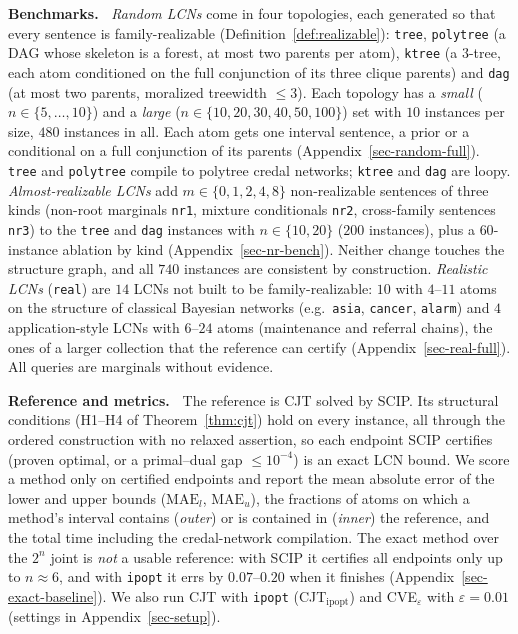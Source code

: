 \documentclass{article} %
\newenvironment{revblock}{\color{blue}}{}
\begin{document}
\begin{revblock}
\textbf{Benchmarks.~}
\emph{Random LCNs} come in four topologies, each generated so that every sentence is family-realizable (Definition~\ref{def:realizable}): \texttt{tree}, \texttt{polytree} (a DAG whose skeleton is a forest, at most two parents per atom), \texttt{ktree} (a $3$-tree, each atom conditioned on the full conjunction of its three clique parents) and \texttt{dag} (at most two parents, moralized treewidth $\le 3$). Each topology has a \emph{small} ($n \in \{5,\dots,10\}$) and a \emph{large} ($n \in \{10,20,30,40,50,100\}$) set with $10$ instances per size, $480$ instances in all. Each atom gets one interval sentence, a prior or a conditional on a full conjunction of its parents (Appendix~\ref{sec-random-full}). \texttt{tree} and \texttt{polytree} compile to polytree credal networks; \texttt{ktree} and \texttt{dag} are loopy. \emph{Almost-realizable LCNs} add $m\in\{0,1,2,4,8\}$ non-realizable sentences of three kinds (non-root marginals \texttt{nr1}, mixture conditionals \texttt{nr2}, cross-family sentences \texttt{nr3}) to the \texttt{tree} and \texttt{dag} instances with $n\in\{10,20\}$ ($200$ instances), plus a $60$-instance ablation by kind (Appendix~\ref{sec-nr-bench}). Neither change touches the structure graph, and all $740$ instances are consistent by construction.
\emph{Realistic LCNs} (\texttt{real}) are $14$ LCNs not built to be family-realizable: $10$ with $4$--$11$ atoms on the structure of classical Bayesian networks (e.g.\ \texttt{asia}, \texttt{cancer}, \texttt{alarm}) and $4$ application-style LCNs with $6$--$24$ atoms (maintenance and referral chains), the ones of a larger collection that the reference can certify (Appendix~\ref{sec-real-full}). All queries are marginals without evidence.

\textbf{Reference and metrics.~}
The reference is CJT solved by SCIP. Its structural conditions (H1--H4 of Theorem~\ref{thm:cjt}) hold on every instance, all through the ordered construction with no relaxed assertion, so each endpoint SCIP certifies (proven optimal, or a primal--dual gap $\le 10^{-4}$) is an exact LCN bound. We score a method only on certified endpoints and report the mean absolute error of the lower and upper bounds ($\mathrm{MAE}_l$, $\mathrm{MAE}_u$), the fractions of atoms on which a method's interval contains (\emph{outer}) or is contained in (\emph{inner}) the reference, and the total time including the credal-network compilation. The exact method over the $2^n$ joint is \emph{not} a usable reference: with SCIP it certifies all endpoints only up to $n\approx6$, and with \texttt{ipopt} it errs by $0.07$--$0.20$ when it finishes (Appendix~\ref{sec-exact-baseline}). We also run CJT with \texttt{ipopt} (CJT$_{\text{ipopt}}$) and CVE$_\varepsilon$ with $\varepsilon{=}0.01$ (settings in Appendix~\ref{sec-setup}).


\end{revblock}
\end{document}
